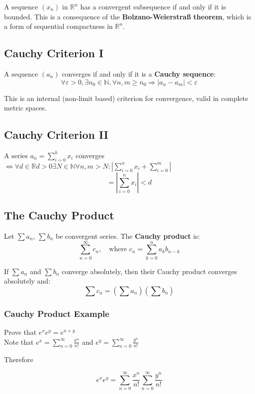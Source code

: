 A sequence \((x_n)\) in \(\mathbb{R}^n\) has a convergent subsequence if and only if it is bounded. This is a consequence of the \textbf{Bolzano-Weierstraß theorem}, which is a form of sequential compactness in \(\mathbb{R}^n\).

\subsection{Cauchy Criterion I}

A sequence \((a_n)\) converges if and only if it is a \textbf{Cauchy sequence}:
\[
\forall \varepsilon > 0, \exists n_0 \in \mathbb{N}, \forall n, m \ge n_0 \Rightarrow |a_n - a_m| < \varepsilon
\]

This is an internal (non-limit based) criterion for convergence, valid in complete metric spaces.

\subsection{Cauchy Criterion II}
A series \(a_n = \sum_{i = 0}^{k}x_i\) converges \(\iff \forall d \in \mathbb{R} d > 0 
\exists N \in \mathbb{N} \forall n,m > N: \left| \sum_{i = 0}^{n}x_i + \sum_{i=0}^{m}\right|\)
\[= \left|\sum_{i = 0}^{n}x_i\right| < d\]


\subsection{The Cauchy Product}

Let \(\sum a_n\), \(\sum b_n\) be convergent series. The \textbf{Cauchy product} is:
\[
\sum_{n=0}^\infty c_n, \quad \text{where } c_n = \sum_{k=0}^n a_k b_{n-k}
\]

If \(\sum a_n\) and \(\sum b_n\) converge absolutely, then their Cauchy product converges absolutely and:
\[
\sum c_n = \left( \sum a_n \right) \left( \sum b_n \right)
\]

\subsubsection{Cauchy Product Example}

Prove that \(e^x  e^y = e^{x + y}\)\\
Note that \(e^x = \sum_{n = 0}^{\infty} \frac{x^n}{n!}\) and \(e^y = \sum_{n = 0}^{\infty} \frac{y^n}{n!}\)

Therefore

\[
  e^x e^y = \sum_{n = 0}^{\infty} \frac{x^n}{n!} \sum_{n = 0}^{\infty} \frac{y^n}{n!}
\]

